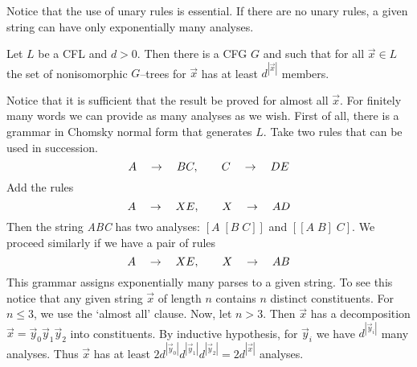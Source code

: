 Notice that the use of unary rules is essential. If there are no 
unary rules, a given string can have only exponentially many 
analyses. 
\begin{lem}
\label{lem:cschaetz}
Let $L$ be a CFL and $d > 0$. Then there is a CFG $G$ and such 
that for all $\vec{x} \in L$ the set of nonisomorphic $G$--trees 
for $\vec{x}$ has at least $d^{|\vec{x}|}$ members.
\end{lem}
\proofbeg
Notice that it is sufficient that the result be proved for almost
all $\vec{x}$. For finitely many words we can provide as many
analyses as we wish. First of all, there is a grammar in Chomsky
normal form that generates $L$. Take two rules that can be used in
succession.
\begin{equation}
A\quad \rightarrow\quad BC, \qquad C\quad \rightarrow\quad DE 
\end{equation}
Add the rules
\begin{equation}
A\quad \rightarrow\quad  XE, \qquad X\quad\rightarrow\quad AD
\end{equation}
Then the string {\it ABC} has two analyses: $[A\; [B\; C]]$
and $[[A\; B]\; C]$. We proceed similarly if we have a pair of rules
\begin{equation}
A\quad\rightarrow\quad XE, \qquad X\quad\rightarrow\quad AB
\end{equation}
This grammar assigns exponentially many parses to a given
string. To see this notice that any given string $\vec{x}$
of length $n$ contains $n$ distinct constituents. For $n \leq 3$,
we use the `almost all' clause. Now, let $n > 3$. Then $\vec{x}$
has a decomposition $\vec{x} = \vec{y}_0\vec{y}_1\vec{y}_2$
into constituents. By inductive hypothesis, for $\vec{y}_i$
we have $d^{|\vec{y}_i|}$ many analyses. Thus $\vec{x}$ has at least
$2d^{|\vec{y}_0|}d^{|\vec{y}_1|}d^{|\vec{y}_2|} = 2d^{|\vec{x}|}$
analyses.
\proofend

